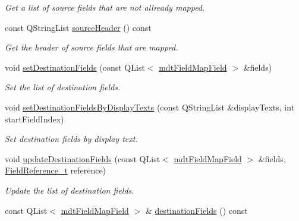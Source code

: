 \begin{DoxyCompactItemize}
\begin{DoxyCompactList}\small\item\em Get a list of source fields that are not allready mapped. \end{DoxyCompactList}\item 
const QStringList \hyperlink{classmdt_field_map_a90eaf7b7d88fdbc5a9aed699973dc8c3}{sourceHeader} () const 
\begin{DoxyCompactList}\small\item\em Get the header of source fields that are mapped. \end{DoxyCompactList}\item 
void \hyperlink{classmdt_field_map_ade135ff5cb703c0d07e628773a537008}{setDestinationFields} (const QList$<$ \hyperlink{classmdt_field_map_field}{mdtFieldMapField} $>$ \&fields)
\begin{DoxyCompactList}\small\item\em Set the list of destination fields. \end{DoxyCompactList}\item 
void \hyperlink{classmdt_field_map_a056668f338ddb31af849922a1f27aeec}{setDestinationFieldsByDisplayTexts} (const QStringList \&displayTexts, int startFieldIndex)
\begin{DoxyCompactList}\small\item\em Set destination fields by display text. \end{DoxyCompactList}\item 
void \hyperlink{classmdt_field_map_a2f0f2c1958b328d83d166ebd95bfca3b}{updateDestinationFields} (const QList$<$ \hyperlink{classmdt_field_map_field}{mdtFieldMapField} $>$ \&fields, \hyperlink{classmdt_field_map_a8a8dd62273d396d926bf3df837407392}{FieldReference\_\-t} reference)
\begin{DoxyCompactList}\small\item\em Update the list of destination fields. \end{DoxyCompactList}\item 
\hypertarget{classmdt_field_map_ad1bd0470eb318308d23a9a687a1c4517}{
const QList$<$ \hyperlink{classmdt_field_map_field}{mdtFieldMapField} $>$ \& \hyperlink{classmdt_field_map_ad1bd0470eb318308d23a9a687a1c4517}{destinationFields} () const }
\label{classmdt_field_map_ad1bd0470eb318308d23a9a687a1c4517}


\end{DoxyCompactItemize}
